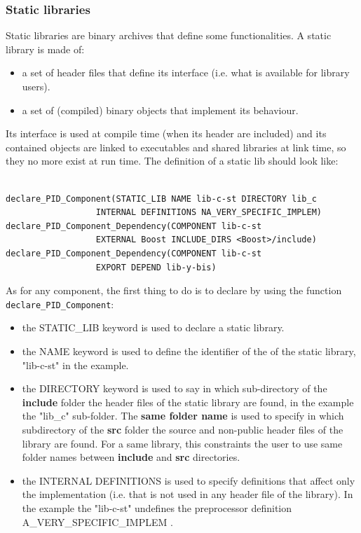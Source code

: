 \documentclass[12pt,a4paper]{article}
\begin{document}
\subsubsection{Static libraries}
\label{sec:libCMakeStatic}

Static libraries are binary archives that define some functionalities. A static library is made of:
\begin{itemize}
\item a set of header files that define its interface (i.e. what is available for library users).
\item a set of (compiled) binary objects that implement its behaviour.
\end{itemize}
Its interface is used at compile time (when its header are included) and its contained objects are linked to executables and shared libraries at link time, so they no more exist at run time. The definition of a static lib should look like:

\begin{verbatim}

declare_PID_Component(STATIC_LIB NAME lib-c-st DIRECTORY lib_c
                  INTERNAL DEFINITIONS NA_VERY_SPECIFIC_IMPLEM)
declare_PID_Component_Dependency(COMPONENT lib-c-st
                  EXTERNAL Boost INCLUDE_DIRS <Boost>/include)
declare_PID_Component_Dependency(COMPONENT lib-c-st 
                  EXPORT DEPEND lib-y-bis)

\end{verbatim}

As for any component, the first thing to do is to declare by using the function \texttt{declare\_PID\_Component}:
\begin{itemize}
\item the STATIC\_LIB keyword is used to declare a static library.
\item the NAME keyword is used to define the identifier of the of the static library, "lib-c-st" in the example.
\item the DIRECTORY keyword is used to say in which sub-directory of the \textbf{include} folder the header files of the static library are found, in the example the "lib\_c" sub-folder. The \textbf{same folder name} is used to specify in which subdirectory of the \textbf{src} folder the source and non-public header files of the library are found. For a same library, this constraints the user to use same folder names between \textbf{include} and \textbf{src} directories.
\item the INTERNAL DEFINITIONS is used to specify definitions that affect only the implementation (i.e. that is not used in any header file of the library). In the example the "lib-c-st" undefines the preprocessor definition A\_VERY\_SPECIFIC\_IMPLEM .
\end{itemize}
\end{document}
